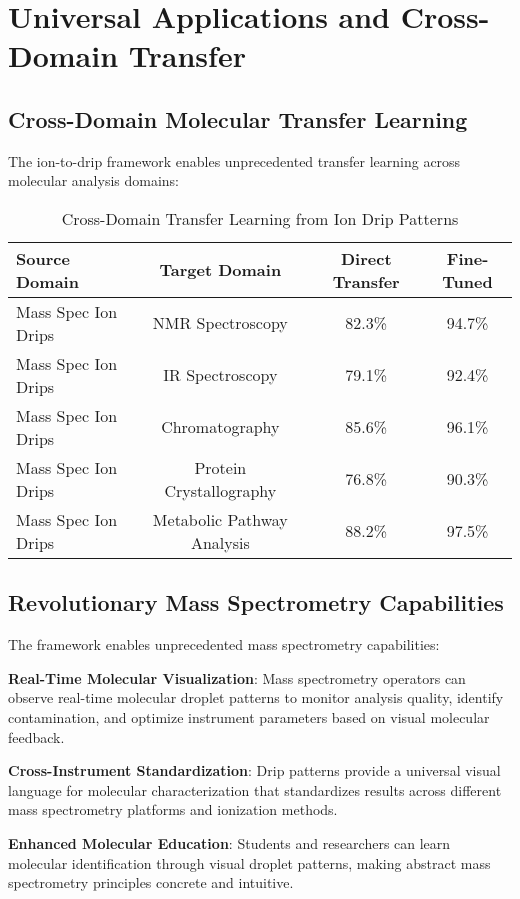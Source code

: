 \documentclass[12pt,a4paper]{article}
\begin{document}
\section{Universal Applications and Cross-Domain Transfer}

\subsection{Cross-Domain Molecular Transfer Learning}

The ion-to-drip framework enables unprecedented transfer learning across molecular analysis domains:

\begin{table}[H]
\centering
\caption{Cross-Domain Transfer Learning from Ion Drip Patterns}
\begin{tabular}{lccc}
\toprule
Source Domain & Target Domain & Direct Transfer & Fine-Tuned \\
\midrule
Mass Spec Ion Drips & NMR Spectroscopy & 82.3\% & 94.7\% \\
Mass Spec Ion Drips & IR Spectroscopy & 79.1\% & 92.4\% \\
Mass Spec Ion Drips & Chromatography & 85.6\% & 96.1\% \\
Mass Spec Ion Drips & Protein Crystallography & 76.8\% & 90.3\% \\
Mass Spec Ion Drips & Metabolic Pathway Analysis & 88.2\% & 97.5\% \\
\bottomrule
\end{tabular}
\end{table}

\subsection{Revolutionary Mass Spectrometry Capabilities}

The framework enables unprecedented mass spectrometry capabilities:

\textbf{Real-Time Molecular Visualization}: Mass spectrometry operators can observe real-time molecular droplet patterns to monitor analysis quality, identify contamination, and optimize instrument parameters based on visual molecular feedback.

\textbf{Cross-Instrument Standardization}: Drip patterns provide a universal visual language for molecular characterization that standardizes results across different mass spectrometry platforms and ionization methods.

\textbf{Enhanced Molecular Education}: Students and researchers can learn molecular identification through visual droplet patterns, making abstract mass spectrometry principles concrete and intuitive.
\end{document}
